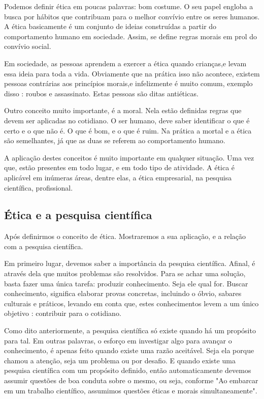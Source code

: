 \documentclass[12pt]{article}
\begin{document}
Podemos definir ética em poucas palavras: bom costume. O seu papel engloba a busca por hábitos que contribuam para o melhor convívio entre os seres humanos. A ética basicamente é um conjunto de ideias construídas a partir do comportamento humano em sociedade. Assim, se define regras morais em prol do convívio social.

Em sociedade, as pessoas aprendem a exercer a ética quando crianças,e levam essa ideia para toda a vida. Obviamente que na prática isso não acontece, existem pessoas contrárias aos princípios morais,e infelizmente é muito comum, exemplo disso : roubos e assassinato. Estas pessoas são ditas antiéticas.

Outro conceito muito importante, é a moral. Nela estão definidas regras que devem ser aplicadas no cotidiano. O ser humano, deve saber identificar o que é certo e o que não é. O que é bom, e o que é ruim. Na prática a mortal e a ética são semelhantes, já que as duas se referem ao comportamento humano.

A aplicação destes conceitos é muito importante em qualquer situação. Uma vez que, estão presentes em todo lugar, e em todo tipo de atividade. A ética é aplicável em inúmeras áreas, dentre elas, a ética empresarial, na pesquisa científica, profissional.


\subsection{Ética e a pesquisa científica} \label{sec:sub1}

Após definirmos o conceito de ética. Mostraremos a sua aplicação, e a relação com a pesquisa científica.

Em primeiro lugar, devemos saber a importância da pesquisa científica. Afinal, é através dela que muitos problemas são resolvidos. Para se achar uma solução, basta fazer uma única tarefa: produzir conhecimento. Seja ele qual for. Buscar conhecimento, significa elaborar provas concretas, incluindo o óbvio, sabares culturais e práticos, levando em conta que, estes conhecimentos levem a um único objetivo : contribuir para o cotidiano.

Como dito anteriormente, a pesquisa científica só existe quando há um propósito para tal. Em outras palavras, o esforço em investigar algo para avançar o conhecimento, é apenas feito quando existe uma razão aceitável. Seja ela porque chamou a atenção, seja um problema ou por desafio. E quando existe uma pesquisa científica com um propósito definido, então automaticamente devemos assumir questões de boa conduta sobre o mesmo, ou seja, conforme \cite{PETER} "Ao embarcar em um trabalho científico, assumimos questões éticas e morais simultaneamente".
\end{document}
